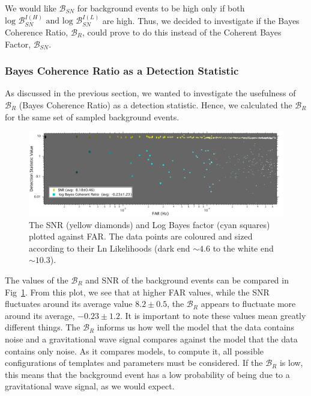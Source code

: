 \documentclass{article}
\begin{document}
 
 
 
  We would like $\mathcal{B}_{SN}$ for background events to be high only if both $\text{log }\mathcal{B}_{SN}^{I(H)}\text{ and } 	\text{log }\mathcal{B}_{SN}^{I(L)}$ are high. Thus, we decided to investigate if the  Bayes Coherence Ratio, $\mathcal{B}_{R}$, could prove to do this instead of the Coherent Bayes Factor, $\mathcal{B}_{SN}$.
  
  
 
 \subsubsection{Bayes Coherence Ratio as a Detection Statistic}
 
 
 As discussed in the previous section, we wanted to investigate the usefulness of $\mathcal{B}_{R}$ (Bayes Coherence Ratio) as a detection statistic. Hence, we calculated the $\mathcal{B}_{R}$ for the same set of sampled background events.\\
 
  

          
          
                   \begin{figure}[h]
                   	\centering
                   	\includegraphics[width=1\textwidth]{Figures/detectionStatVSfar8s.pdf} 
                   	\caption{The SNR (yellow diamonds) and Log Bayes factor (cyan squares) plotted against FAR. The data points are coloured and sized according to their Ln Likelihoods (dark end $\sim4.6$ to the white end $\sim10.3$). }
                   	\label{Fig:BcrVSFAR}
                   \end{figure}
                   
 
 The values of the $\mathcal{B}_{R}$ and SNR of the background events can be compared in Fig~\ref{Fig:BcrVSFAR}. From this plot, we see that at higher FAR values, while the SNR fluctuates around its average value $8.2\pm0.5$, the $\mathcal{B}_{R}$ appears to fluctuate more around its average, $-0.23\pm1.2$. It is important to note these values mean greatly different things. The $\mathcal{B}_{R}$ informs us how well the model that the data contains noise and a gravitational wave signal compares against the model that the data contains only noise. As it compares models, to compute it, all possible configurations of templates and parameters must be considered. If the $\mathcal{B}_{R}$ is low, this means that the background event has a low probability of being due to a gravitational wave signal, as we would expect.\\
 
\end{document}
